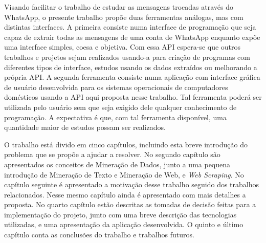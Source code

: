 Visando facilitar o trabalho de estudar as mensagens trocadas através do WhatsApp, o presente trabalho propõe duas ferramentas análogas, mas com distintas interfaces. A primeira consiste numa interface de programação que seja capaz de extrair todas as mensagens de uma conta de WhatsApp enquanto expõe uma interface simples, coesa e objetiva. Com essa API espera-se que outros trabalhos e projetos sejam realizados usando-a para criação de programas com diferentes tipos de interface, estudos usando os dados extraídos ou melhorando a própria API. A segunda ferramenta consiste numa aplicação com interface gráfica de usuário desenvolvida para os sistemas operacionais de computadores domésticos usando a API aqui proposta nesse trabalho. Tal ferramenta poderá ser utilizada pelo usuário sem que seja exigido dele qualquer conhecimento de programação. A expectativa é que, com tal ferramenta disponível, uma quantidade maior de estudos possam ser realizados.




O trabalho está divido em cinco capítulos, incluindo esta breve introdução do problema que se propõe a ajudar a resolver. No segundo capítulo são apresentados os conceitos de Mineração de Dados, junto a uma pequena introdução de Mineração de Texto e Mineração de Web, e \textit{Web Scraping}. No capítulo seguinte é apresentado a motivação desse trabalho seguido dos trabalhos relacionados. Nesse mesmo capítulo ainda é apresentado com mais detalhes a proposta. No quarto capítulo estão descritas as tomadas de decisão feitas para a implementação do projeto, junto com uma breve descrição das tecnologias utilizadas, e uma apresentação da aplicação desenvolvida. O quinto e último capítulo conta as conclusões do trabalho e trabalhos futuros. 